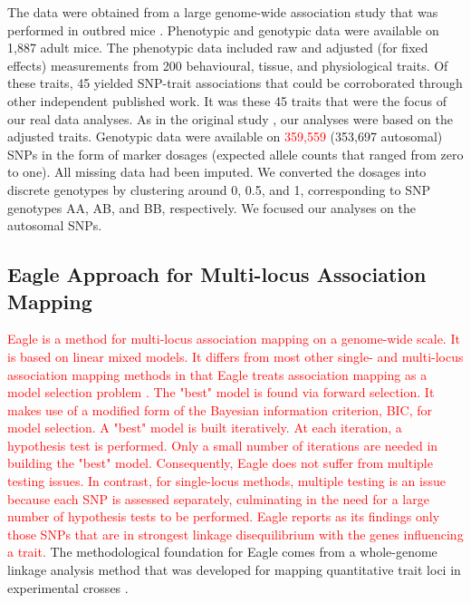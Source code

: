 \documentclass{article}
\begin{document}
The data were obtained from a large genome-wide association study that was performed in outbred mice \citep{nicod2016genome}. 
Phenotypic and genotypic data were available on 1,887 adult mice. 
The phenotypic data included raw and adjusted (for fixed effects) measurements from 200 behavioural, tissue, and physiological traits.  
Of these traits, 
45 yielded SNP-trait associations that could be corroborated through other independent published work. It was these 
45 traits that were the focus of our real data analyses. As in the original study  \citep{nicod2016genome}, our analyses 
were based on the adjusted traits.
Genotypic data were available on \textcolor{red}{359,559} (353,697 autosomal) SNPs in the 
form of marker dosages (expected allele counts that ranged from zero to one). All missing data had been imputed. 
We converted the dosages into discrete genotypes 
by clustering around 0, 0.5, and 1, corresponding to SNP genotypes AA, AB, and BB, respectively. 
We focused our analyses on the autosomal SNPs.




\subsection{Eagle Approach for Multi-locus Association Mapping}
\label{subsection:Eagle}

\textcolor{red}{
Eagle is a method for multi-locus association mapping on a genome-wide scale. It is based on linear mixed models. It differs from most other single- and multi-locus association mapping methods in that Eagle treats association mapping as a model selection problem \citep{ball2001bayesian,broman2002model,yi2005bayesian}. 
The "best" model is found via forward selection. It makes use of a modified form of the Bayesian information criterion, BIC, for model selection.
A "best" model is built iteratively. At each iteration, a hypothesis test is performed. 
Only a small number of iterations are needed in building the "best" model.  Consequently, 
Eagle does not suffer from multiple testing issues.
In contrast,  for single-locus methods, multiple testing is an 
issue because each SNP is assessed separately, culminating in the need for a large number of hypothesis tests to be  performed. 
Eagle 
reports as its findings only those SNPs that are in strongest linkage disequilibrium with  the genes influencing a trait. }
The methodological foundation for Eagle comes from a whole-genome linkage analysis method that was developed for mapping 
quantitative trait loci in experimental crosses \citep{verbyla2007analysis}.
\end{document}
